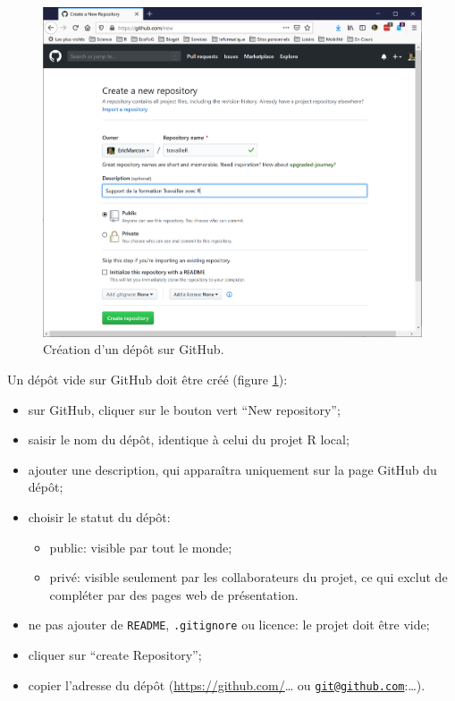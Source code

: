 \documentclass[
  12pt,
  french,
  a4paper,
  extrafontsizes,onecolumn,openright
  ]{memoir}
\providecommand{\tightlist}{%
  \setlength{\itemsep}{0pt}\setlength{\parskip}{0pt}}
\begin{document}
\scriptsize

\begin{figure}

{\centering \includegraphics[width=0.8\linewidth]{images/CreateRepo} 

}

\caption{Création d'un dépôt sur GitHub.}\label{fig:CreateRepo}
\end{figure}

\normalsize

Un dépôt vide sur GitHub doit être créé (figure \ref{fig:CreateRepo}):

\begin{itemize}
\tightlist
\item
  sur GitHub, cliquer sur le bouton vert \enquote{New repository};
\item
  saisir le nom du dépôt, identique à celui du projet R local;
\item
  ajouter une description, qui apparaîtra uniquement sur la page GitHub du dépôt;
\item
  choisir le statut du dépôt:

  \begin{itemize}
  \tightlist
  \item
    public: visible par tout le monde;
  \item
    privé: visible seulement par les collaborateurs du projet, ce qui exclut de compléter par des pages web de présentation.
  \end{itemize}
\item
  ne pas ajouter de \texttt{README}, \texttt{.gitignore} ou licence: le projet doit être vide;
\item
  cliquer sur \enquote{create Repository};
\item
  copier l'adresse du dépôt (\url{https://github.com/}\ldots{} ou \href{mailto:git@github.com}{\nolinkurl{git@github.com}}:\ldots).
\end{itemize}
\end{document}
